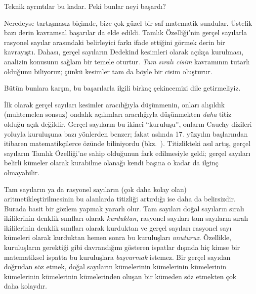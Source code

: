 


Teknik ayrıntılar bu kadar. Peki bunlar neyi başardı?

Neredeyse tartışmasız biçimde, bize çok {güzel} bir saf matematik sundular.
Üstelik bazı derin kavramsal başarılar da elde edildi. Tamlık Özelliği'nin gerçel
sayılarla rasyonel sayılar arasındaki belirleyici farkı ifade ettiğini görmek
derin bir kavrayıştı. Dahası, gerçel sayıların Dedekind kesimleri olarak açıkça
kurulması, analizin konusunu sağlam bir temele oturtur. \emph{Tam sıralı
cisim} kavramının tutarlı olduğunu biliyoruz; çünkü kesimler tam da böyle bir
cisim oluşturur.

Bütün bunlara karşın, bu başarılarla ilgili birkaç çekincemizi dile
getirmeliyiz.

İlk olarak gerçel sayıları kesimler aracılığıyla düşünmenin, onları alışıldık
(muhtemelen sonsuz) ondalık açılımları aracılığıyla düşünmekten
\emph{daha} titiz olduğu açık değildir. Gerçel sayıların bu ikinci “kuruluşu”,
onların Cauchy dizileri yoluyla kuruluşuna bazı yönlerden benzer; fakat aslında
17. yüzyılın başlarından itibaren matematikçilerce özünde biliniyordu
(bkz.\ ). Titizlikteki asıl artış, gerçel sayıların Tamlık
Özelliği'ne sahip olduğunun fark edilmesiyle geldi; gerçel sayıları belirli
kümeler olarak kurabilme olanağı kendi başına o kadar da ilginç olmayabilir.

Tam sayıların ya da rasyonel sayıların (çok daha kolay olan)
aritmetikleştirilmesinin bu alanlarda titizliği artırdığı ise daha da
belirsizdir. Burada basit bir gözlem yapmak yararlı olur. Tam sayıları doğal
sayıların sıralı ikililerinin denklik sınıfları olarak \emph{kurduktan},
rasyonel sayıları tam sayıların sıralı ikililerinin denklik sınıfları olarak
kurduktan ve gerçel sayıları rasyonel sayı kümeleri olarak kurduktan hemen sonra
bu kuruluşları \emph{unuturuz}. Özellikle, kuruluşların gerektiği gibi
davrandığını gösteren ispatlar dışında hiç kimse bir matematiksel ispatta bu
kuruluşlara \emph{başvurmak} istemez. Bir gerçel sayıdan doğrudan söz etmek,
doğal sayıların kümelerinin kümelerinin kümelerinin kümelerinin kümelerinin
kümelerinden oluşan bir kümeden söz etmekten çok daha kolaydır.
%
%
%
	

